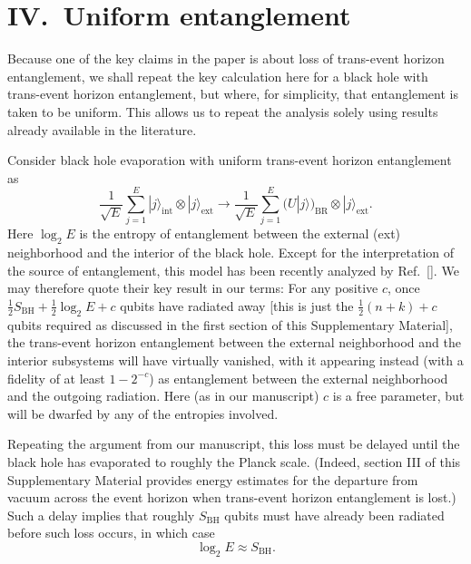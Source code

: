 \documentclass[twocolumn,aps,showpacs,prl]{revtex4}
\begin{document}
\section{IV.\ Uniform entanglement}

Because one of the key claims in the paper is about loss of trans-event
horizon entanglement, we shall repeat the key calculation here
for a black hole with trans-event horizon entanglement, but where,
for simplicity, that entanglement is taken to be uniform. This
allows us to repeat the analysis solely using results already available in
the literature.

Consider black hole evaporation with uniform trans-event
horizon entanglement as
\begin{equation}
\frac{1}{\sqrt{E}}\sum_{j=1}^{E}
|j\rangle_{\text{int}}\otimes|j\rangle_{\text{ext}}\rightarrow
\frac{1}{\sqrt{E}}\sum_{j=1}^{E}
(U|j\rangle)_{\text{BR}} \otimes|j\rangle_{\text{ext}}.
\end{equation}
Here $\log_2 E$ is the entropy of entanglement between the external (ext)
neighborhood and the interior of the black hole. Except for the
interpretation of the source of entanglement, this model has been
recently analyzed by Ref.~[]. We may therefore quote
their key result in our terms: For any positive $c$, once
$\frac{1}{2} S_{\text{BH}}+\frac{1}{2} \log_2 E + c$ qubits have radiated
away [this is just the $\frac{1}{2}(n+k)+c$ qubits required as discussed
in the first section of this Supplementary Material], the 
trans-event horizon entanglement between the external neighborhood and
the interior subsystems will have virtually vanished, with it appearing
instead (with a fidelity of at least $1-2^{-c}$) as entanglement between
the external neighborhood and the outgoing radiation. Here (as in our
manuscript) $c$ is a free parameter, but will be dwarfed by any of the
entropies involved.

Repeating the argument from our manuscript, this loss must be delayed
until the black hole has evaporated to roughly the Planck scale.
(Indeed, section III of this Supplementary Material provides
energy estimates for the departure from vacuum across the event horizon
when trans-event horizon entanglement is lost.) Such a delay implies that
roughly $S_{\text{BH}}$ qubits must have already been radiated before
such loss occurs, in which case
\begin{equation}
\log_2 E\approx S_{\text{BH}}.
\end{equation}
\end{document}
